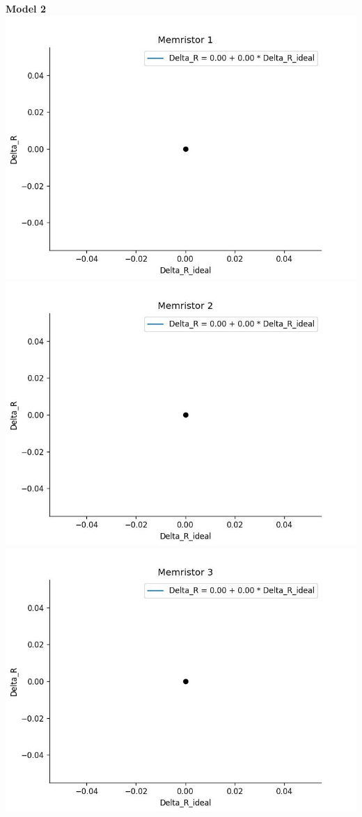     \pagebreak
    \textbf{Model 2} \\
    \includegraphics[width=\textwidth / 2]{code/plots/model_2_memristor_1}
    \includegraphics[width=\textwidth / 2]{code/plots/model_2_memristor_2}
    \includegraphics[width=\textwidth / 2]{code/plots/model_2_memristor_3}
